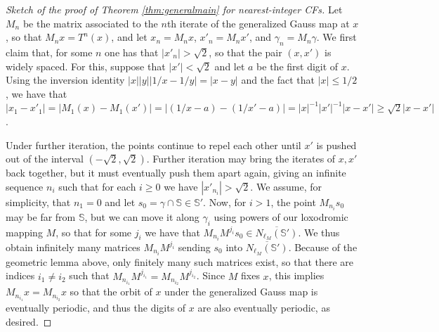 \documentclass[reqno,10pt]{amsart}
\numberwithin{thm}{section}
\theoremstyle{definition}
\theoremstyle{definition}
\numberwithin{equation}{section}
\newcommand{\Sph}{\mathbb S}
\begin{document}
\begin{proof}[Sketch of the proof of Theorem \ref{thm:generalmain} for nearest-integer CFs]
Let $M_n$ be the matrix associated to the $n$th iterate of the generalized Gauss map at $x$, so that $M_nx=T^n(x)$, and let $x_n = M_n x$, $x'_n = M_n x'$, and $\gamma_n=M_n\gamma$.  We first claim that, for some $n$ one has that $|x'_n|>\sqrt{2}$, so that the pair $(x,x')$ is widely spaced. For this, suppose that $|x'|<\sqrt{2}$ and let $a$ be the first digit of $x$. Using the inversion identity $|x||y||1/x-1/y|=|x-y|$ and the fact that $|x|\leq 1/2$, we have that $|x_1-x'_1|=|M_1(x)-M_1(x')| = |(1/x-a) - (1/x'-a)| = |x|^{-1}|x'|^{-1}|x-x'| \geq \sqrt{2} |x-x'|$.

Under further iteration, the points continue to repel each other until $x'$ is pushed out of the interval $(-\sqrt{2},\sqrt{2})$. Further iteration may bring the iterates of $x, x'$ back together, but it must eventually push them apart again, giving an infinite sequence $n_i$ such that for each $i\geq 0$ we have $|x'_{n_i}|>\sqrt{2}$. We assume, for simplicity, that $n_1=0$ and let $s_0=\gamma\cap \Sph \in \Sph'$. Now, for $i>1$, the point $M_{n_i}s_0$ may be far from $\Sph$, but we can move it along $\gamma_i$ using powers of our loxodromic mapping $M$, so that for some $j_i$ we have that $M_{n_i}M^{j_i}s_0\in \overline{N_{\ell_M}(\Sph')}$. We thus obtain infinitely many matrices $M_{n_i}M^{j_i}$ sending $s_0$ into $\overline{N_{\ell_M}(\Sph')}$. Because of the geometric lemma above, only finitely many such matrices exist, so that there are indices $i_1 \neq i_2$ such that $M_{n_{i_1}}M^{j_{i_1}}=M_{n_{i_2}}M^{j_{i_2}}$. Since $M$ fixes $x$, this implies $M_{n_{i_1}}x=M_{n_{i_2}}x$ so that the orbit of $x$ under the generalized Gauss map is eventually periodic, and thus the digits of $x$ are also eventually periodic, as desired.
\end{proof}
\end{document}
